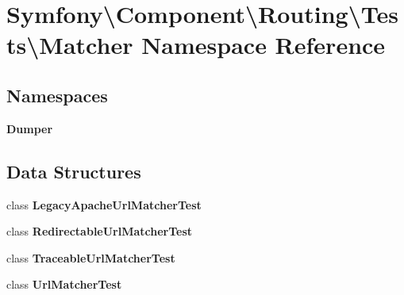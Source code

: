 \section{Symfony\textbackslash{}Component\textbackslash{}Routing\textbackslash{}Tests\textbackslash{}Matcher Namespace Reference}
\label{namespace_symfony_1_1_component_1_1_routing_1_1_tests_1_1_matcher}
\subsection*{Namespaces}
\begin{DoxyCompactItemize}
\item 
 {\bf Dumper}
\end{DoxyCompactItemize}
\subsection*{Data Structures}
\begin{DoxyCompactItemize}
\item 
class {\bf Legacy\+Apache\+Url\+Matcher\+Test}
\item 
class {\bf Redirectable\+Url\+Matcher\+Test}
\item 
class {\bf Traceable\+Url\+Matcher\+Test}
\item 
class {\bf Url\+Matcher\+Test}
\end{DoxyCompactItemize}
